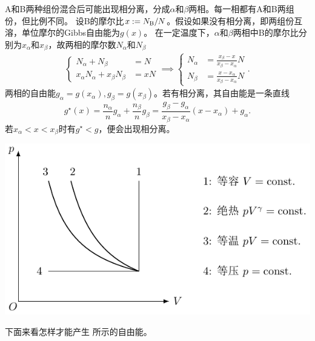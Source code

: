 A和B两种组份混合后可能出现相分离，分成$\alpha$和$\beta$两相。每一相都有A和B两组份，但比例不同。%
设B的摩尔比$x:=N_{\rm B}/N$。假设如果没有相分离，即两组份互溶，单位摩尔的Gibbs自由能为$g(x)$。
	在一定温度下，$\alpha$和$\beta$两相中B的摩尔比分别为$x_\alpha$和$x_\beta$，故两相的摩尔数$N_\alpha$和$N_\beta$%
\begin{align*}
	\left\{
	\begin{aligned}
		N_\alpha+N_\beta                  & =N  \\
		x_\alpha N_\alpha+x_\beta N_\beta & =xN
	\end{aligned}
	\right.\implies
	\left\{
	\begin{aligned}
		N_\alpha & =\frac{x_\beta-x}{x_\beta-x_\alpha}N  \\
		N_\beta  & =\frac{x-x_\alpha}{x_\beta-x_\alpha}N
	\end{aligned}
	\right..
\end{align*}
两相的自由能$g_\alpha=g(x_\alpha),g_\beta=g(x_\beta)$。若有相分离，其自由能是一条直线
\[
	g^\star(x)=\frac{n_\alpha}ng_\alpha+\frac{n_\beta}ng_\beta
	=\frac{g_\beta-g_\alpha}{x_\beta-x_\alpha}(x-x_\alpha)+g_\alpha.
\]
若$x_\alpha<x<x_\beta$时有$g^\star<g$，便会出现相分离。
\begin{center}
	\includegraphics[page=18]{figures/tikz/coordinates.pdf}
	\label{fig:phase separation}
\end{center}
下面来看怎样才能产生 所示的自由能。
